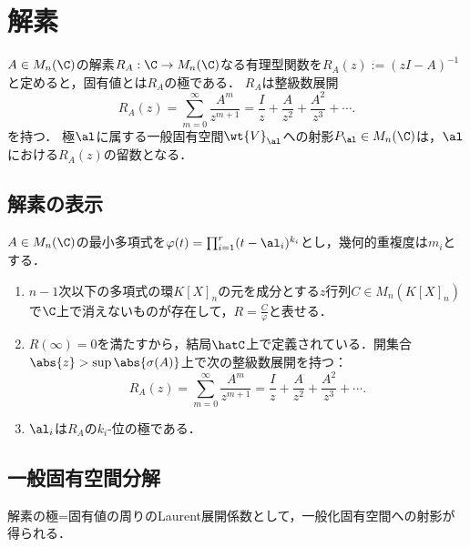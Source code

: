 \documentclass[uplatex, dvipdfmx]{jsreport}
\begin{document}
\section{解素}

\begin{tcolorbox}[colframe=ForestGreen, colback=ForestGreen!10!white,breakable,colbacktitle=ForestGreen!40!white,coltitle=black,fonttitle=\bfseries\sffamily,
title=解素は指数関数の$M_n(\C)$値への拡張である]
    $A\in M_n(\C)$の解素$R_A:\C\to M_n(\C)$なる有理型関数を$R_A(z):=(zI-A)^{-1}$と定めると，固有値とは$R_A$の極である．
    $R_A$は整級数展開
    \[R_A(z)=\sum_{m=0}^\infty\frac{A^m}{z^{m+1}}=\frac{I}{z}+\frac{A}{z^2}+\frac{A^2}{z^3}+\cdots.\]
    を持つ．
    極$\al$に属する一般固有空間$\wt{V}_\al$への射影$P_\al\in M_n(\C)$は，$\al$における$R_A(z)$の留数となる．
\end{tcolorbox}

\subsection{解素の表示}

\begin{theorem}[解素の整級数展開]
    $A\in M_n(\C)$の最小多項式を$\varphi(t)=\prod_{i=1}^r(t-\al_i)^{k_i}$とし，幾何的重複度は$m_i$とする．
    \begin{enumerate}
        \item $n-1$次以下の多項式の環$K[X]_n$の元を成分とする$z$行列$C\in M_n(K[X]_n)$で$\C$上で消えないものが存在して，$R=\frac{C}{\varphi}$と表せる．
        \item $R(\infty)=0$を満たすから，結局$\hatC$上で定義されている．開集合$\abs{z}>\sup\abs{\sigma(A)}$上で次の整級数展開を持つ：
        \[R_A(z)=\sum_{m=0}^\infty\frac{A^m}{z^{m+1}}=\frac{I}{z}+\frac{A}{z^2}+\frac{A^2}{z^3}+\cdots.\]
        \item $\al_i$は$R_A$の$k_i$-位の極である．
    \end{enumerate}
\end{theorem}

\subsection{一般固有空間分解}

\begin{tcolorbox}[colframe=ForestGreen, colback=ForestGreen!10!white,breakable,colbacktitle=ForestGreen!40!white,coltitle=black,fonttitle=\bfseries\sffamily,
title=]
    解素の極=固有値の周りのLaurent展開係数として，一般化固有空間への射影が得られる．
\end{tcolorbox}
\end{document}
